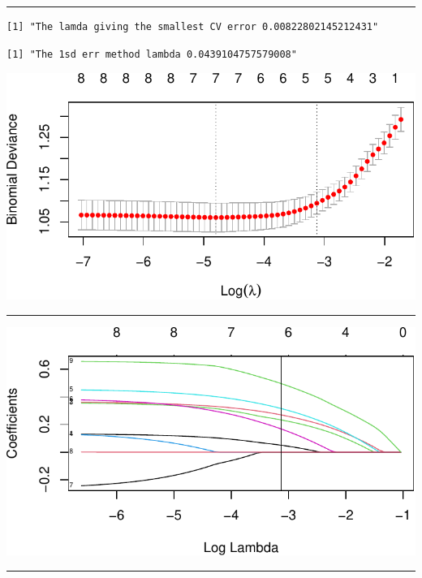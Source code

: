 \documentclass[
  letterpaper,
  DIV=11,
  numbers=noendperiod]{scrartcl}
\begin{document}
\begin{center}\rule{0.5\linewidth}{0.5pt}\end{center}

\begin{verbatim}
[1] "The lamda giving the smallest CV error 0.00822802145212431"
\end{verbatim}

\begin{verbatim}
[1] "The 1sd err method lambda 0.0439104757579008"
\end{verbatim}

\includegraphics{L10_files/figure-pdf/unnamed-chunk-20-1.pdf}

\begin{center}\rule{0.5\linewidth}{0.5pt}\end{center}

\includegraphics{L10_files/figure-pdf/unnamed-chunk-21-1.pdf}

\begin{center}\rule{0.5\linewidth}{0.5pt}\end{center}
\end{document}
